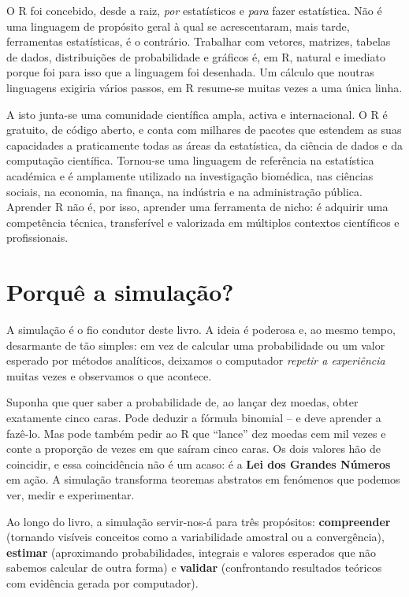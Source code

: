 \documentclass[
  portuguese,
  11pt,
  openany]{book}
\begin{document}
O R foi concebido, desde a raiz, \emph{por} estatísticos e \emph{para} fazer estatística.
Não é uma linguagem de propósito geral à qual se acrescentaram, mais tarde,
ferramentas estatísticas, é o contrário. Trabalhar com vetores, matrizes,
tabelas de dados, distribuições de probabilidade e gráficos é, em R, natural e imediato porque foi para isso que a linguagem foi desenhada. Um cálculo que
noutras linguagens exigiria vários passos, em R resume-se muitas vezes a uma
única linha.

A isto junta-se uma comunidade científica ampla, activa e internacional. O R é gratuito, de código aberto, e conta com milhares de pacotes que estendem as suas capacidades a praticamente todas as áreas da estatística, da ciência de dados e da computação científica. Tornou-se uma linguagem de referência na estatística académica e é amplamente utilizado na investigação biomédica, nas ciências sociais, na economia, na finança, na indústria e na administração pública. Aprender R não é, por isso, aprender uma ferramenta de nicho: é adquirir uma competência técnica, transferível e valorizada em múltiplos contextos científicos e profissionais.

\section{Porquê a simulação?}\label{porquuxea-a-simulauxe7uxe3o}

A simulação é o fio condutor deste livro. A ideia é poderosa e, ao mesmo tempo, desarmante de tão simples: em vez de calcular uma probabilidade ou um valor esperado por métodos analíticos, deixamos o computador \emph{repetir a experiência} muitas vezes e observamos o que acontece.

Suponha que quer saber a probabilidade de, ao lançar dez moedas, obter exatamente cinco caras. Pode deduzir a fórmula binomial -- e deve aprender a fazê-lo. Mas pode também pedir ao R que ``lance'' dez moedas cem mil vezes e conte a proporção de vezes em que saíram cinco caras. Os dois valores hão de coincidir, e essa coincidência não é um acaso: é a \textbf{Lei dos Grandes Números} em ação. A simulação transforma teoremas abstratos em fenómenos que podemos ver, medir e experimentar.

Ao longo do livro, a simulação servir-nos-á para três propósitos: \textbf{compreender} (tornando visíveis conceitos como a variabilidade amostral ou a convergência), \textbf{estimar} (aproximando probabilidades, integrais e valores esperados que não sabemos calcular de outra forma) e \textbf{validar} (confrontando resultados teóricos com evidência gerada por computador).
\end{document}
